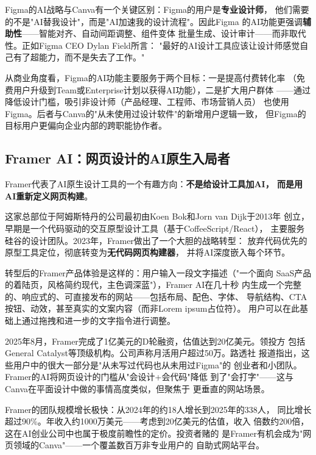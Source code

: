 Figma的AI战略与Canva有一个关键区别：Figma的用户是\textbf{专业设计师}，
他们需要的不是"AI替我设计"，而是"AI加速我的设计流程"。因此Figma
的AI功能更强调\textbf{辅助性}——智能对齐、自动间距调整、组件变体
批量生成、设计审计——而非取代性。正如Figma CEO Dylan Field所言：
"最好的AI设计工具应该让设计师感觉自己有了超能力，而不是失去了工作。"

从商业角度看，Figma的AI功能主要服务于两个目标：一是提高付费转化率
（免费用户升级到Team或Enterprise计划以获得AI功能），二是扩大用户群体
——通过降低设计门槛，吸引非设计师（产品经理、工程师、市场营销人员）
也使用Figma。后者与Canva的"从未使用过设计软件"的新增用户逻辑一致，
但Figma的目标用户更偏向企业内部的跨职能协作者。

\subsection{Framer AI：网页设计的AI原生入局者}
\label{subsec:framer-ai}

Framer代表了AI原生设计工具的一个有趣方向：\textbf{不是给设计工具加AI，
而是用AI重新定义网页构建}。

这家总部位于阿姆斯特丹的公司最初由Koen Bok和Jorn van Dijk于2013年
创立，早期是一个代码驱动的交互原型设计工具（基于CoffeeScript/React），
主要服务硅谷的设计团队。2023年，Framer做出了一个大胆的战略转型：
放弃代码优先的原型工具定位，彻底转变为\textbf{无代码网页构建器}，
并将AI深度嵌入每个环节。

转型后的Framer产品体验是这样的：用户输入一段文字描述（"一个面向
SaaS产品的着陆页，风格简约现代，主色调深蓝"），Framer AI在几十秒
内生成一个完整的、响应式的、可直接发布的网站——包括布局、配色、字体、
导航结构、CTA按钮、动效，甚至真实的文案内容（而非Lorem ipsum占位符）。
用户可以在此基础上通过拖拽和进一步的文字指令进行调整。

2025年8月，Framer完成了1亿美元的D轮融资，估值达到20亿美元。领投方
包括General Catalyst等顶级机构。公司声称月活用户超过50万。路透社
报道指出，这些用户中的很大一部分是"从未写过代码也从未用过Figma"的
创业者和小团队。Framer的AI将网页设计的门槛从"会设计+会代码"降低
到了"会打字"——这与Canva在平面设计中做的事情高度类似，但聚焦于
更垂直的网站场景。

Framer的团队规模增长极快：从2024年的约18人增长到2025年的338人，
同比增长超过90\%。年收入约1000万美元——考虑到20亿美元的估值，收入
倍数约200倍，这在AI创业公司中也属于极度前瞻性的定价。投资者赌的
是Framer有机会成为"网页领域的Canva"——一个覆盖数百万非专业用户的
自助式网站平台。

